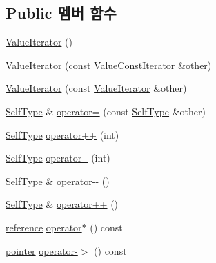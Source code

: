 \subsection*{Public 멤버 함수}
\begin{DoxyCompactItemize}
\item 
\hyperlink{class_json_1_1_value_iterator_a09425cf4dc12244072a942f290a5c0ec}{Value\+Iterator} ()
\item 
\hyperlink{class_json_1_1_value_iterator_aa85aa208670891670392259efa0143bb}{Value\+Iterator} (const \hyperlink{class_json_1_1_value_const_iterator}{Value\+Const\+Iterator} \&other)
\item 
\hyperlink{class_json_1_1_value_iterator_a7d5e58a9a4a553968acdf3064b39d21c}{Value\+Iterator} (const \hyperlink{class_json_1_1_value_iterator}{Value\+Iterator} \&other)
\item 
\hyperlink{class_json_1_1_value_iterator_base_a9d2a940d03ea06d20d972f41a89149ee}{Self\+Type} \& \hyperlink{class_json_1_1_value_iterator_a8e23312b1db874f7e403fd7e76611bdc}{operator=} (const \hyperlink{class_json_1_1_value_iterator_base_a9d2a940d03ea06d20d972f41a89149ee}{Self\+Type} \&other)
\item 
\hyperlink{class_json_1_1_value_iterator_base_a9d2a940d03ea06d20d972f41a89149ee}{Self\+Type} \hyperlink{class_json_1_1_value_iterator_abcf4ddd994a010742cd4a436d65acd08}{operator++} (int)
\item 
\hyperlink{class_json_1_1_value_iterator_base_a9d2a940d03ea06d20d972f41a89149ee}{Self\+Type} \hyperlink{class_json_1_1_value_iterator_a06d6a29d96caf6af324a53973159e12b}{operator-\/-\/} (int)
\item 
\hyperlink{class_json_1_1_value_iterator_base_a9d2a940d03ea06d20d972f41a89149ee}{Self\+Type} \& \hyperlink{class_json_1_1_value_iterator_a811302a868518a0995a9def955df5720}{operator-\/-\/} ()
\item 
\hyperlink{class_json_1_1_value_iterator_base_a9d2a940d03ea06d20d972f41a89149ee}{Self\+Type} \& \hyperlink{class_json_1_1_value_iterator_a92146c46f8249e2b2d12869e70cd4cee}{operator++} ()
\item 
\hyperlink{class_json_1_1_value_iterator_ae87929b4567aa00372cf602c43b57160}{reference} \hyperlink{class_json_1_1_value_iterator_a3be48b0c1729ec2532f1ff27ad465d32}{operator$\ast$} () const
\item 
\hyperlink{class_json_1_1_value_iterator_acec45feb1ef1f3bf81240157d06d5432}{pointer} \hyperlink{class_json_1_1_value_iterator_a8dfc1603f92467591d524d0326f35534}{operator-\/$>$} () const
\item 

\end{DoxyCompactItemize}
